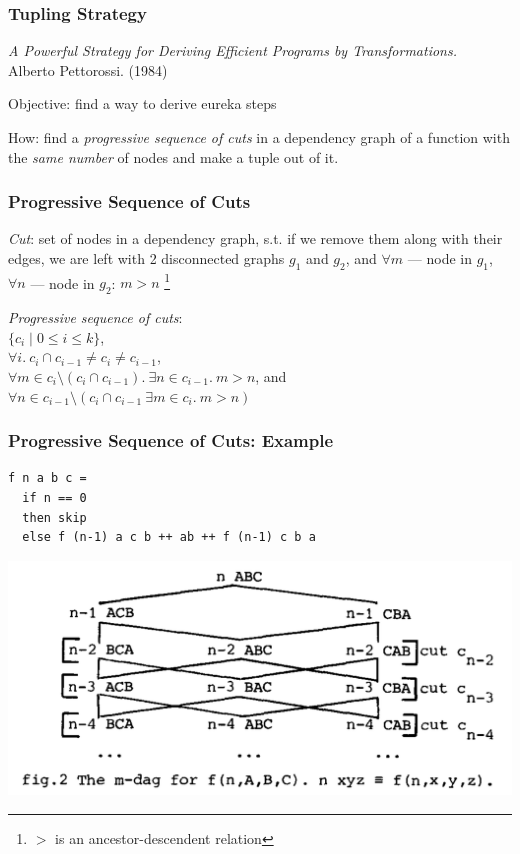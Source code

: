 \documentclass{beamer}
\begin{document}
\begin{frame}[t]
  \frametitle{Tupling Strategy}
\textit{A Powerful Strategy for Deriving Efficient Programs by Transformations.} \\Alberto Pettorossi. (1984)

\vspace{0.6cm}

Objective: find a way to derive eureka steps

\vspace{0.6cm}

How: find a \textit{progressive sequence of cuts} in a dependency graph of a function with the \textit{same number} of nodes and make a tuple out of it.
\end{frame}

\begin{frame}[fragile]
  \frametitle{Progressive Sequence of Cuts}
\textit{Cut}: set of nodes in a dependency graph, s.t. if we remove them along with their edges, we are left with 2 disconnected graphs $g_1$ and $g_2$, and $\forall m$ --- node in $g_1$, $\forall n$ --- node in $g_2$: $m > n$ \footnote{$>$ is an ancestor-descendent relation}

\vspace{0.6cm}

\textit{Progressive sequence of cuts}:
\\ $\{c_i \mid 0 \le i \le k\}$,
\\ $\forall i. \ c_i \cap c_{i-1} \neq c_i \neq c_{i-1}$,
\\ $\forall m \in c_i \setminus (c_i \cap c_{i-1}). \ \exists n \in c_{i-1}. \ m > n$, and
\\ $\forall n \in c_{i-1} \setminus (c_i \cap c_{i-1} \ \exists m \in c_i. \ m > n)$
\end{frame}

\begin{frame}[fragile]
  \frametitle{Progressive Sequence of Cuts: Example}
  \begin{verbatim}
f n a b c =
  if n == 0
  then skip
  else f (n-1) a c b ++ ab ++ f (n-1) c b a
  \end{verbatim}
\begin{center}
  \includegraphics[width=\textwidth]{Hanoi.png}
\end{center}
\end{frame}
\end{document}
